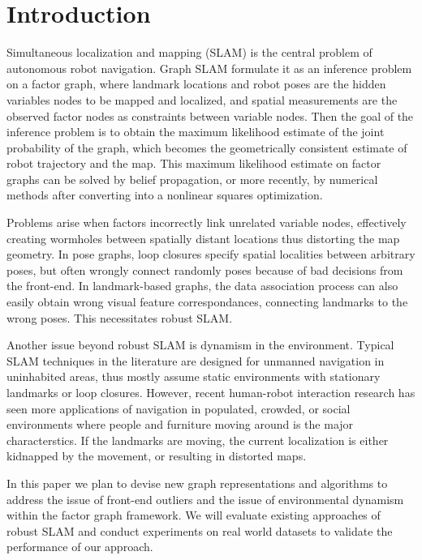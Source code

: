 \section{Introduction}
Simultaneous localization and mapping (SLAM) is the central problem of
autonomous robot navigation. Graph SLAM formulate it as an inference problem
on a factor graph, where landmark locations and robot poses are the hidden
variables nodes to be mapped and localized, and spatial measurements are the
observed factor nodes as constraints between variable nodes. Then the goal of
the inference problem is to obtain the maximum likelihood estimate of the
joint probability of the graph, which becomes the geometrically consistent
estimate of robot trajectory and the map. This maximum likelihood estimate on
factor graphs can be solved by belief propagation, or more recently, by
numerical methods after converting into a nonlinear squares optimization.

Problems arise when factors incorrectly link unrelated variable nodes,
effectively creating wormholes between spatially distant locations thus
distorting the map geometry. In pose graphs, loop closures specify spatial
localities between arbitrary poses, but often wrongly connect randomly poses
because of bad decisions from the front-end.  In landmark-based graphs, the
data association process can also easily obtain wrong visual feature
correspondances, connecting landmarks to the wrong poses. This necessitates
robust SLAM.

Another issue beyond robust SLAM is dynamism in the environment. Typical SLAM
techniques in the literature are designed for unmanned navigation in
uninhabited areas, thus mostly assume static environments with stationary
landmarks or loop closures. However, recent human-robot interaction research
has seen more applications of navigation in populated, crowded, or social
environments where people and furniture moving around is the major
characterstics. If the landmarks are moving, the current localization is either
kidnapped by the movement, or resulting in distorted maps.

In this paper we plan to devise new graph representations and algorithms to
address the issue of front-end outliers and the issue of environmental
dynamism within the factor graph framework. We will evaluate existing
approaches of robust SLAM and conduct experiments on real world datasets to
validate the performance of our approach.
